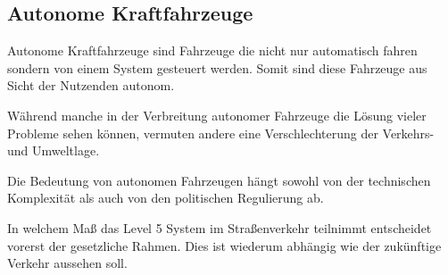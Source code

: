 \subsection{Autonome Kraftfahrzeuge}
Autonome Kraftfahrzeuge sind Fahrzeuge die nicht nur automatisch fahren sondern von einem System gesteuert werden.
Somit sind diese Fahrzeuge aus Sicht der Nutzenden autonom.

Während manche in der Verbreitung autonomer Fahrzeuge die Lösung vieler Probleme sehen können,
vermuten andere eine Verschlechterung der Verkehrs- und Umweltlage.

Die Bedeutung von autonomen Fahrzeugen hängt sowohl von der technischen Komplexität als auch von den politischen Regulierung ab.

In welchem Maß das Level 5 System im Straßenverkehr teilnimmt entscheidet vorerst der gesetzliche Rahmen.
Dies ist wiederum abhängig wie der zukünftige Verkehr aussehen soll.